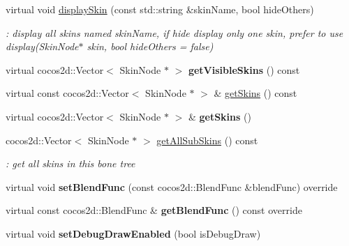 \begin{DoxyCompactItemize}
virtual void \hyperlink{classBoneNode_aecbb23abc82a6ff62e2db36b9f24bc5b}{display\+Skin} (const std\+::string \&skin\+Name, bool hide\+Others)
\begin{DoxyCompactList}\small\item\em \+: display all skins named skin\+Name, if hide display only one skin, prefer to use display(Skin\+Node$\ast$ skin, bool hide\+Others = false) \end{DoxyCompactList}\item 
\mbox{\label{classBoneNode_a2bccd304f9de95ec33714bd485520422}} 
virtual cocos2d\+::\+Vector$<$ Skin\+Node $\ast$ $>$ {\bfseries get\+Visible\+Skins} () const
\item 
virtual const cocos2d\+::\+Vector$<$ Skin\+Node $\ast$ $>$ \& \hyperlink{classBoneNode_ad1e49b0e034dc298bcc8cf349c820584}{get\+Skins} () const
\item 
\mbox{\label{classBoneNode_a47d9df0dd30de267b857e7e630298d4a}} 
virtual cocos2d\+::\+Vector$<$ Skin\+Node $\ast$ $>$ \& {\bfseries get\+Skins} ()
\item 
\mbox{\label{classBoneNode_a50331bcab0915d00cf43f50c5faf72cd}} 
cocos2d\+::\+Vector$<$ Skin\+Node $\ast$ $>$ \hyperlink{classBoneNode_a50331bcab0915d00cf43f50c5faf72cd}{get\+All\+Sub\+Skins} () const
\begin{DoxyCompactList}\small\item\em \+: get all skins in this bone tree \end{DoxyCompactList}\item 
\mbox{\label{classBoneNode_a7efcc6ec2c7a08a16953292c90d4bb5b}} 
virtual void {\bfseries set\+Blend\+Func} (const cocos2d\+::\+Blend\+Func \&blend\+Func) override
\item 
\mbox{\label{classBoneNode_ac473ec193799b1dc545eaf2157b94089}} 
virtual const cocos2d\+::\+Blend\+Func \& {\bfseries get\+Blend\+Func} () const override
\item 
\mbox{\label{classBoneNode_affe873d7e6beab348289e99cbc8a8d45}} 
virtual void {\bfseries set\+Debug\+Draw\+Enabled} (bool is\+Debug\+Draw)
\item 
\mbox{\label{classBoneNode_a604f22582dbd1d52f218023522812025}} 

\end{DoxyCompactItemize}
